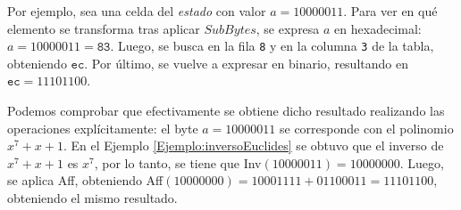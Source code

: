 \begin{Revision}
    Por ejemplo, sea una celda del \textit{estado} con valor $a = 10000011$. Para ver en qué elemento se transforma tras aplicar $SubBytes$, se expresa $a$ en hexadecimal: $a = 10000011 =\texttt{83}$. Luego, se busca en la fila \texttt{8} y en la columna \texttt{3} de la tabla, obteniendo $\texttt{ec}$. Por último, se vuelve a expresar en binario, resultando en $\texttt{ec} = 11101100$.
    
    Podemos comprobar que efectivamente se obtiene dicho resultado realizando las operaciones explícitamente: el byte $a = 10000011$ se corresponde con el polinomio $x^7 + x + 1$. En el Ejemplo \ref{Ejemplo:inversoEuclides} se obtuvo que el inverso de $x^7 + x + 1$ es $x^7$, por lo tanto, se tiene que Inv$(10000011) = 10000000$. Luego, se aplica Aff, obteniendo Aff$(10000000) = 10001111 + 01100011 = 11101100$, obteniendo el mismo resultado.
    \end{Revision}

